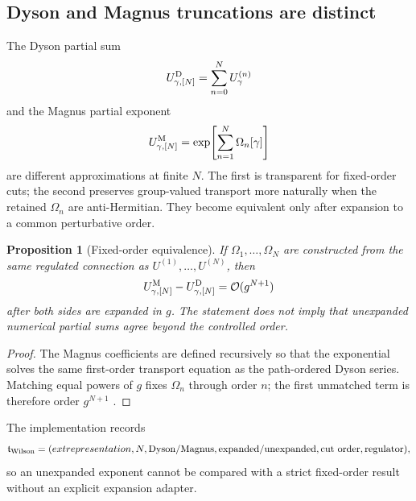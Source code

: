 \documentclass[11pt]{article}
\newtheorem{proposition}[definition]{Proposition}
\newcommand{\cO}{\mathcal O}
\begin{document}
\subsection{Dyson and Magnus truncations are distinct}

The Dyson partial sum
\begin{equation}
 U_{\gamma,[N]}^{\rm D}
 =\sum_{n=0}^{N}U_{\gamma}^{(n)}
\label{eq:dyson-partial-sum}
\end{equation}
and the Magnus partial exponent
\begin{equation}
 U_{\gamma,[N]}^{\rm M}
 =\exp\!\left[\sum_{n=1}^{N}\Omega_n[\gamma]\right]
\label{eq:magnus-partial-sum}
\end{equation}
are different approximations at finite \(N\).  The first is transparent for
fixed-order cuts; the second preserves group-valued transport more naturally
when the retained \(\Omega_n\) are anti-Hermitian.  They become equivalent
only after expansion to a common perturbative order.

\begin{proposition}[Fixed-order equivalence]
\label{prop:dyson-magnus-equivalence}
If \(\Omega_1,\ldots,\Omega_N\) are constructed from the same regulated
connection as \(U^{(1)},\ldots,U^{(N)}\), then
\begin{equation}
 U_{\gamma,[N]}^{\rm M}
 -U_{\gamma,[N]}^{\rm D}
 =\cO(g^{N+1})
\label{eq:dyson-magnus-difference}
\end{equation}
after both sides are expanded in \(g\).  The statement does not imply that
unexpanded numerical partial sums agree beyond the controlled order.
\end{proposition}

\begin{proof}
The Magnus coefficients are defined recursively so that the exponential
solves the same first-order transport equation as the path-ordered Dyson
series.  Matching equal powers of \(g\) fixes \(\Omega_n\) through order
\(n\); the first unmatched term is therefore order \(g^{N+1}\)
\cite{Magnus1954}.
\end{proof}

The implementation records
\begin{equation}
 \mathfrak t_{\rm Wilson}
 =(	ext{representation},N,\text{Dyson/Magnus},
   \text{expanded/unexpanded},\text{cut order},\text{regulator}),
\label{eq:wilson-truncation-id}
\end{equation}
so an unexpanded exponent cannot be compared with a strict fixed-order result
without an explicit expansion adapter.
\end{document}
